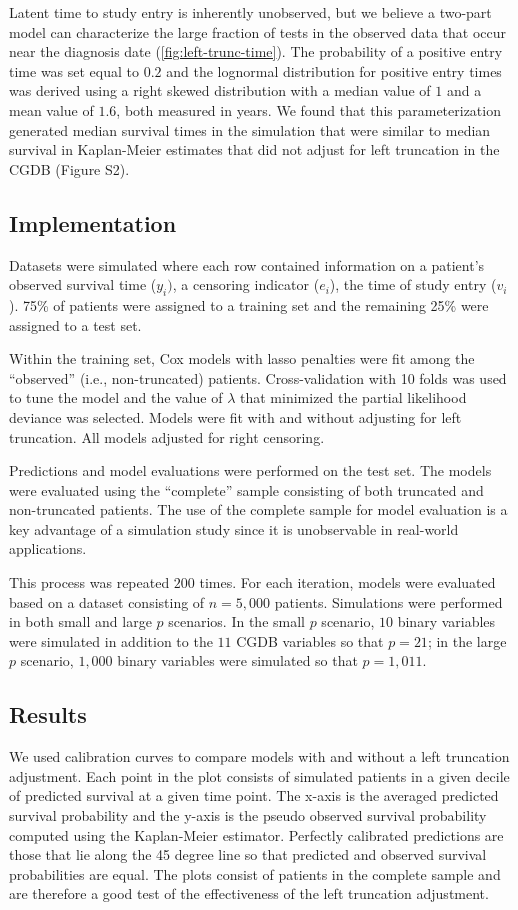 \documentclass[11pt,final,fleqn]{article}\usepackage[]{graphicx}\usepackage[]{color}
\theoremstyle{plain}
\begin{document}
Latent time to study entry is inherently unobserved, but we believe a two-part model can characterize the large fraction of tests in the observed data that occur near the diagnosis date  (\autoref{fig:left-trunc-time}). The probability of a positive entry time was set equal to $0.2$ and the lognormal distribution for positive entry times was derived using a right skewed distribution with a median value of $1$ and a mean value of $1.6$, both measured in years.  We found that this parameterization generated median survival times in the simulation that were similar to median survival in Kaplan-Meier estimates that did not adjust for left truncation in the CGDB (Figure S2).

\subsection{Implementation}
Datasets were simulated where each row contained information on a patient's observed survival time ($y_i)$, a censoring indicator ($e_i$), the time of study entry ($v_i$). 75\%  of patients were assigned to a training set and the remaining 25\% were assigned to a test set. 

Within the training set, Cox models with lasso penalties were fit among the ``observed'' (i.e., non-truncated) patients. Cross-validation with 10 folds was used to tune the  model and the value of $\lambda$ that minimized the partial likelihood deviance was selected. Models were fit with and without adjusting for left truncation. All models adjusted for right censoring.

Predictions and model evaluations were performed on the test set. The models were evaluated using the ``complete'' sample consisting of both truncated and non-truncated patients. The use of the complete sample for model evaluation is a key advantage of a simulation study since it is unobservable in real-world applications.

This process was repeated $200$ times. For each iteration, models were evaluated based on a dataset consisting of $n=5,000$ patients. Simulations were performed in both small and large $p$ scenarios. In the small $p$ scenario, $10$ binary variables were simulated in addition to the $11$ CGDB variables so that $p=21$; in the large $p$ scenario, $1,000$ binary variables were simulated so that $p=1,011$.

\subsection{Results}
We used calibration curves \cite{harrell2015regression} to compare models with and without a left truncation adjustment. Each point in the plot consists of simulated patients in a given decile of predicted survival at a given time point. The x-axis is the averaged predicted survival probability and the y-axis is the pseudo observed survival probability computed using the Kaplan-Meier estimator. Perfectly calibrated predictions are those that lie along the 45 degree line so that predicted and observed survival probabilities are equal. The plots consist of patients in the complete sample and are therefore a good test of the effectiveness of the left truncation adjustment.
\end{document}
